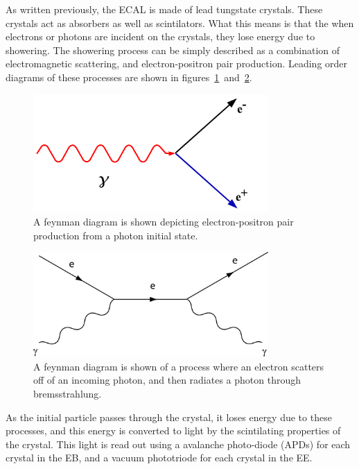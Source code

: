 \clearpage

As written previously, the ECAL is made of lead tungstate crystals.
These crystals act as absorbers as well as scintilators.
What this means is that the when electrons or photons are incident on the crystals, they lose energy due to showering.
The showering process can be simply described as a combination of electromagnetic scattering, and electron-positron pair production.
Leading order diagrams of these processes are shown in figures~\ref{fig:pair_production}~and~\ref{fig:photon_brem}.

\begin{figure}[!ht]
\begin{center}
\includegraphics[width=0.8\textwidth]{cms/figs/Pair_Production.png}
\caption{ A feynman diagram is shown depicting electron-positron pair production from a photon initial state.
\label{fig:pair_production}
}
\end{center}
\end{figure}

\begin{figure}[!ht]
\begin{center}
\includegraphics[width=0.8\textwidth]{cms/figs/photon_brem.png}
\caption{
  A feynman diagram is shown of a process where an electron scatters off of an incoming photon,
  and then radiates a photon through bremsstrahlung.
\label{fig:photon_brem}
}
\end{center}
\end{figure}

As the initial particle passes through the crystal, it loses energy due to these processes, and this energy is converted to light by the scintilating properties of the crystal.
This light is read out using a avalanche photo-diode (APDs) for each crystal in the EB, and a vacuum phototriode for each crystal in the EE.

